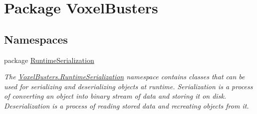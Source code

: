 \hypertarget{namespace_voxel_busters}{}\section{Package Voxel\+Busters}
\label{namespace_voxel_busters}
\subsection*{Namespaces}
\begin{DoxyCompactItemize}
\item 
package \hyperlink{namespace_voxel_busters_1_1_runtime_serialization}{Runtime\+Serialization}
\begin{DoxyCompactList}\small\item\em The \hyperlink{namespace_voxel_busters_1_1_runtime_serialization}{Voxel\+Busters.\+Runtime\+Serialization} namespace contains classes that can be used for serializing and deserializing objects at runtime. Serialization is a process of converting an object into binary stream of data and storing it on disk. Deserialization is a process of reading stored data and recreating objects from it. \end{DoxyCompactList}\end{DoxyCompactItemize}
